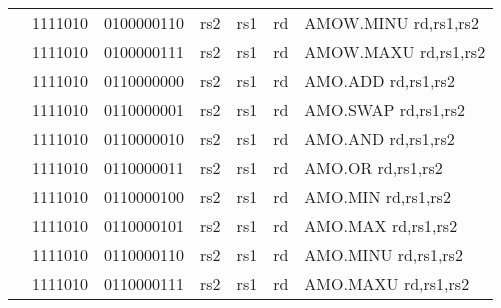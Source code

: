 \begin{table}[p]
\begin{small}
\begin{center}
\begin{tabular}{rcccccccccl}
&
\multicolumn{1}{|c|}{1111010} &
\multicolumn{5}{c|}{0100000110} &
\multicolumn{1}{c|}{rs2} &
\multicolumn{1}{c|}{rs1} &
\multicolumn{1}{c|}{rd} & AMOW.MINU rd,rs1,rs2 \\
\cline{2-10}
  

&
\multicolumn{1}{|c|}{1111010} &
\multicolumn{5}{c|}{0100000111} &
\multicolumn{1}{c|}{rs2} &
\multicolumn{1}{c|}{rs1} &
\multicolumn{1}{c|}{rd} & AMOW.MAXU rd,rs1,rs2 \\
\cline{2-10}
  

&
\multicolumn{1}{|c|}{1111010} &
\multicolumn{5}{c|}{0110000000} &
\multicolumn{1}{c|}{rs2} &
\multicolumn{1}{c|}{rs1} &
\multicolumn{1}{c|}{rd} & AMO.ADD rd,rs1,rs2 \\
\cline{2-10}
  

&
\multicolumn{1}{|c|}{1111010} &
\multicolumn{5}{c|}{0110000001} &
\multicolumn{1}{c|}{rs2} &
\multicolumn{1}{c|}{rs1} &
\multicolumn{1}{c|}{rd} & AMO.SWAP rd,rs1,rs2 \\
\cline{2-10}
  

&
\multicolumn{1}{|c|}{1111010} &
\multicolumn{5}{c|}{0110000010} &
\multicolumn{1}{c|}{rs2} &
\multicolumn{1}{c|}{rs1} &
\multicolumn{1}{c|}{rd} & AMO.AND rd,rs1,rs2 \\
\cline{2-10}
  

&
\multicolumn{1}{|c|}{1111010} &
\multicolumn{5}{c|}{0110000011} &
\multicolumn{1}{c|}{rs2} &
\multicolumn{1}{c|}{rs1} &
\multicolumn{1}{c|}{rd} & AMO.OR rd,rs1,rs2 \\
\cline{2-10}
  

&
\multicolumn{1}{|c|}{1111010} &
\multicolumn{5}{c|}{0110000100} &
\multicolumn{1}{c|}{rs2} &
\multicolumn{1}{c|}{rs1} &
\multicolumn{1}{c|}{rd} & AMO.MIN rd,rs1,rs2 \\
\cline{2-10}
  

&
\multicolumn{1}{|c|}{1111010} &
\multicolumn{5}{c|}{0110000101} &
\multicolumn{1}{c|}{rs2} &
\multicolumn{1}{c|}{rs1} &
\multicolumn{1}{c|}{rd} & AMO.MAX rd,rs1,rs2 \\
\cline{2-10}
  

&
\multicolumn{1}{|c|}{1111010} &
\multicolumn{5}{c|}{0110000110} &
\multicolumn{1}{c|}{rs2} &
\multicolumn{1}{c|}{rs1} &
\multicolumn{1}{c|}{rd} & AMO.MINU rd,rs1,rs2 \\
\cline{2-10}
  

&
\multicolumn{1}{|c|}{1111010} &
\multicolumn{5}{c|}{0110000111} &
\multicolumn{1}{c|}{rs2} &
\multicolumn{1}{c|}{rs1} &
\multicolumn{1}{c|}{rd} & AMO.MAXU rd,rs1,rs2 \\
\cline{2-10}
  

\end{tabular}
\end{center}
\end{small}

\label{instr-table}
\end{table}
  

